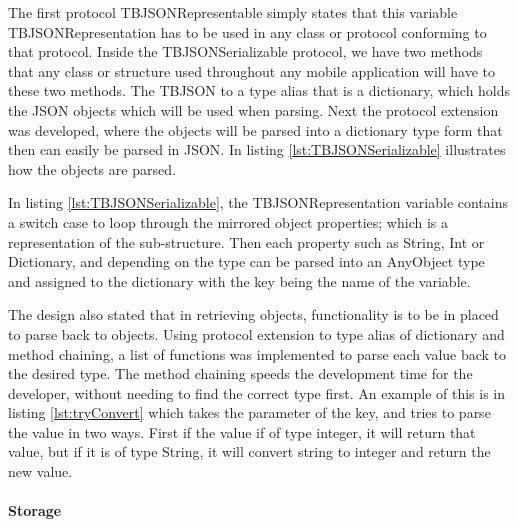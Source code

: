 

The first protocol TBJSONRepresentable simply states that this variable TBJSONRepresentation has to be used in any class or protocol conforming to that protocol. Inside the TBJSONSerializable protocol, we have two methods that any class or structure used throughout any mobile application will have to these two methods. The TBJSON to a type alias that is a dictionary, which holds the JSON objects which will be used when parsing. Next the protocol extension was developed, where the objects will be parsed into a dictionary type form that then can easily be parsed in JSON. In listing \ref{lst:TBJSONSerializable} illustrates how the objects are parsed.



In listing \ref{lst:TBJSONSerializable}, the TBJSONRepresentation variable contains a switch case to loop through the mirrored object properties; which is a representation of the sub-structure. Then each property such as String, Int or Dictionary, and depending on the type can be parsed into an AnyObject type and assigned to the dictionary with the key being the name of the variable.

The design also stated that in retrieving objects, functionality is to be in placed to parse back to objects. Using protocol extension to type alias of dictionary and method chaining, a list of functions was implemented to parse each value back to the desired type. The method chaining speeds the development time for the developer, without needing to find the correct type first. An example of this is in listing \ref{lst:tryConvert} which takes the parameter of the key, and tries to parse the value in two ways. First if the value if of type integer, it will return that value, but if it is of type String, it will convert string to integer and return the new value.



\paragraph{Storage}

